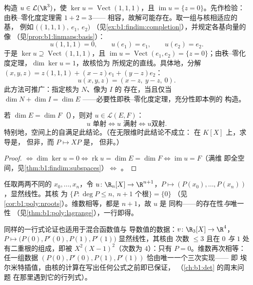 \begin{example}[按指定要求构造映射]
\label{ex:b1:linmaps:tospec}
构造 $u \in \mathcal{L}(\R^3)$，使 $\ker u =
\operatorname{Vect}(1,1,1)$，且 $\operatorname{im} u = \{z =
0\}$。先作检验：由秩--零化度定理需 $1 + 2 = 3$——
相容，故解可能存在。取一组与核相适应的基，
例如 $\bigl((1,1,1),\ e_1,\ e_2\bigr)$
（见\cref{ex:b1:findim:completion}），并规定各基向量的像
（见\cref{prop:b1:linmaps:basis}）：
\[
u(1,1,1) = 0, \qquad u(e_1) = e_1, \qquad u(e_2) = e_2 .
\]
于是 $\ker u \supseteq \operatorname{Vect}(1,1,1)$，且
$\operatorname{im} u = \operatorname{Vect}(e_1, e_2) = \{z =
0\}$；由秩--零化度定理，$\dim\ker u = 1$，故核恰为
所规定的直线。具体地，分解 $(x, y, z)
= z(1,1,1) + (x - z)e_1 + (y - z)e_2$：
\[
u(x, y, z) = (x - z,\ y - z,\ 0).
\]
此方法可推广：指定核为 $N$、像为 $I$ 的
存在，当且仅当 $\dim N + \dim I = \dim E$
——必要性即秩--零化度定理，充分性即本例的
构造。
\end{example}

\begin{corollary}\label{cor:b1:linmaps:samedim}
若 $\dim E = \dim F$（），则对 $u \in \mathcal{L}(E, F)$：
\[
u \text{ 单射} \iff u \text{ 满射} \iff u \text{
双射}.
\]
特别地，空间上的自满足此结论。（在无限维时此结论不成立：
在 $K[X]$ 上，求导是，
但非，而 $P \mapsto XP$ 是，
但非。）
\end{corollary}

\begin{proof}
 $\iff \dim\ker u = 0 \iff \operatorname{rk} u = \dim E =
\dim F \iff \operatorname{im} u = F$（满维
即全空间，见\cref{thm:b1:findim:subspaces}）$\iff$ 。
\end{proof}

\begin{example}[从结构看插值]\label{ex:b1:linmaps:interpolation}
任取两两不同的 $x_0, \dots, x_n$，令 $u \colon \R_n[X] \to
\R^{n+1}$，$P \mapsto (P(x_0), \dots, P(x_n))$，显然线性。其核
为 $\{P : \deg P \leq n,\ n+1 \text{ 个根}\} = \{0\}$
（见\cref{cor:b1:poly:nroots}）。维数相等，都是 $n + 1$，故 $u$ 是
同构——的存在性\emph{与}唯一性
（见\cref{thm:b1:poly:lagrange}），一行即得。

同样的一行式论证也适用于混合函数值与
导数值的数据：$v \colon \R_3[X] \to \R^4$，$P \mapsto \bigl(P(0),
P'(0), P(1), P'(1)\bigr)$ 显然线性，其核由
次数 $\leq 3$ 且在 $0$ \emph{与}
$1$ 处有二重根的组成，即被 $X^2(X-1)^2$（次数为 $4$）：只有 $P =
0$。维数再次相等：任一组数据 $(P(0),
P'(0), P(1), P'(1))$ 恰由唯一一个三次实现——
即 埃尔米特插值，由核的计算在写出任何公式之前即已保证，
（\cref{ch:b1:det} 的周末问题
在那里遇到它的行列式）。
\end{example}


